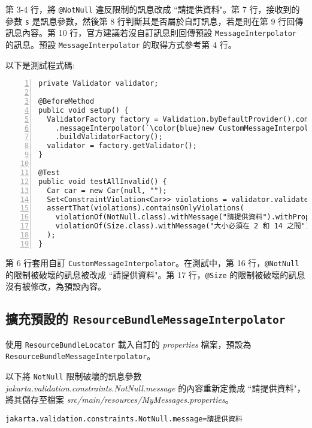 第 3-4 行，將 \texttt{@NotNull} 違反限制的訊息改成 ``請提供資料"。第 7 行，接收到的參數 \texttt{s} 是訊息參數，然後第 8 行判斷其是否屬於自訂訊息，若是則在第 9 行回傳訊息內容。第 10 行，官方建議若沒自訂訊息則回傳預設 \texttt{MessageInterpolator} 的訊息。預設 \texttt{MessageInterpolator} 的取得方式參考第 4 行。

以下是測試程式碼:

\begin{lstlisting}[numbers=left, basicstyle=\linespread{1}\ttfamily\footnotesize, xleftmargin=1.5\parindent]
private Validator validator;

@BeforeMethod
public void setup() {
  ValidatorFactory factory = Validation.byDefaultProvider().configure()
    .messageInterpolator(`\color{blue}new CustomMessageInterpolator()`)
    .buildValidatorFactory();
  validator = factory.getValidator();
}

@Test
public void testAllInvalid() {
  Car car = new Car(null, "");
  Set<ConstraintViolation<Car>> violations = validator.validate(car);
  assertThat(violations).containsOnlyViolations(
    violationOf(NotNull.class).withMessage("請提供資料").withProperty("manufacturer"),
    violationOf(Size.class).withMessage("大小必須在 2 和 14 之間").withProperty("licensePlate")
  );
}
\end{lstlisting}

第 6 行套用自訂 \texttt{CustomMessageInterpolator}。在測試中，第 16 行，\texttt{@NotNull} 的限制被破壞的訊息被改成 ``請提供資料"。第 17 行，\texttt{@Size} 的限制被破壞的訊息沒有被修改，為預設內容。

\subsection{擴充預設的 \texttt{ResourceBundleMessageInterpolator}}

使用 \texttt{ResourceBundleLocator} 載入自訂的 \textit{properties} 檔案，預設為 \texttt{ResourceBundleMessageInterpolator}。

以下將 \texttt{NotNull} 限制破壞的訊息參數 \textit{jakarta.validation.constraints.NotNull.message} 的內容重新定義成 ``請提供資料"，將其儲存至檔案 \textit{src/main/resources/MyMessages.properties}。

\begin{lstlisting}
jakarta.validation.constraints.NotNull.message=請提供資料
\end{lstlisting}

